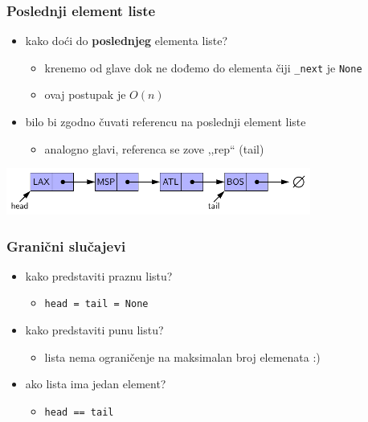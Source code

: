 \documentclass[compress]{beamer}
\begin{document}
\begin{frame}[fragile]
  \frametitle{Poslednji element liste}
  \begin{itemize}
    \item kako doći do \textbf{poslednjeg} elementa liste?
    \begin{itemize}
      \item krenemo od glave dok ne dođemo do elementa čiji \texttt{\_next} je \texttt{None}
      \item ovaj postupak je $O(n)$
    \end{itemize}
    \item bilo bi zgodno čuvati referencu na poslednji element liste
    \begin{itemize}
      \item analogno glavi, referenca se zove ,,rep`` (tail)
    \end{itemize}
  \end{itemize}
  \begin{center}
    \includegraphics[width=10cm]{asp-07-pic02a.pdf}
  \end{center}
\end{frame}

\begin{frame}[fragile]
  \frametitle{Granični slučajevi}
  \begin{itemize}
    \item kako predstaviti praznu listu?
    \begin{itemize}
      \item \texttt{head = tail = None}
    \end{itemize}
    \item kako predstaviti punu listu?
    \begin{itemize}
      \item lista nema ograničenje na maksimalan broj elemenata :)
    \end{itemize}
    \item ako lista ima jedan element?
    \begin{itemize}
      \item \texttt{head == tail}
    \end{itemize}
  \end{itemize}
\end{frame}
\end{document}

